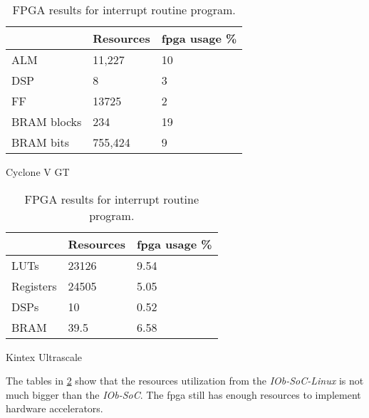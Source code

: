 \begin{table}[!ht]
    \begin{subtable}[h]{0.45\textwidth}
        \centering
        \begin{tabular}{l|l|l|}
            \cline{2-3}
                                              & Resources & \acrshort{fpga} usage \% \\ \hline
            \multicolumn{1}{|l|}{ALM}         & 11,227    & 10                       \\ \hline
            \multicolumn{1}{|l|}{DSP}         & 8         & 3                        \\ \hline
            \multicolumn{1}{|l|}{FF}          & 13725     & 2                        \\ \hline
            \multicolumn{1}{|l|}{BRAM blocks} & 234       & 19                       \\ \hline
            \multicolumn{1}{|l|}{BRAM bits}   & 755,424   & 9                        \\ \hline
        \end{tabular}
       \caption{Cyclone V GT}
       \label{tab:cyclone_linux}
    \end{subtable}
    \hfill
    \begin{subtable}[h]{0.45\textwidth}
        \centering
        \begin{tabular}{l|l|l|}
            \cline{2-3}
                                            & Resources & \acrshort{fpga} usage \% \\ \hline
            \multicolumn{1}{|l|}{LUTs}      & 23126     & 9.54                     \\ \hline
            \multicolumn{1}{|l|}{Registers} & 24505     & 5.05                     \\ \hline
            \multicolumn{1}{|l|}{DSPs}      & 10        & 0.52                     \\ \hline
            \multicolumn{1}{|l|}{BRAM}      & 39.5      & 6.58                     \\ \hline
        \end{tabular}
        \caption{Kintex Ultrascale}
        \label{tab:kintex_linux}
     \end{subtable}
     \caption{FPGA results for interrupt routine program.}
     \label{tab:fpga_linux}
\end{table}

The tables in \ref{tab:fpga_linux} show that the resources utilization from the \textit{IOb-SoC-Linux} is not much bigger than the \textit{IOb-SoC}. The \acrshort{fpga} still has enough resources to implement hardware accelerators.
